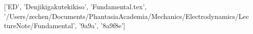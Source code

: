 ['ED', 'Denjikigakutekikiso', 'Fundamental.tex', '/Users/zechen/Documents/PhantasiaAcademia/Mechanics/Electrodynamics/LectureNote/Fundamental', '\xad{}\x9a\xae{}\xae\x9a', '\x8a\x9f\x8e\xaf{}\xba{}']
